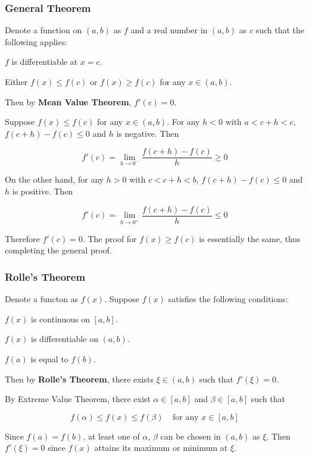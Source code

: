 \subsubsection{General Theorem}
\begin{thm}
  Denote a function on $(a,b)$ as $f$ and a real number in $(a,b)$ as $c$ such that the following applies:

  \begin{alist}
    \item $f$ is differentiable at $x=c$.
    \item Either $f(x)\leq f(c)$ or $f(x)\geq f(c)$ for any $x\in (a,b)$.
  \end{alist}

  Then by \textbf{Mean Value Theorem}, $f'(c)=0$.\n

  \prf Suppose $f(x)\leq f(c)$ for any $x\in (a,b)$. For any $h<0$ with $a<c+h<c$, $f(c+h)-f(c)\leq 0$ and $h$ is negative. Then

  $$f'(c)=\lim_{h\to 0^{-}}\frac{f(c+h)-f(c)}{h}\geq 0$$\s

  On the other hand, for any $h>0$ with $c<c+h<b$, $f(c+h)-f(c)\leq 0$ and $h$ is positive. Then

  $$f'(c)=\lim_{h\to 0^{+}}\frac{f(c+h)-f(c)}{h}\leq 0$$\s

  Therefore $f'(c)=0$. The proof for $f(x)\geq f(c)$ is essentially the same, thus completing the general proof.
\end{thm}

\subsubsection{Rolle's Theorem}
\begin{thm}
  Denote a functon as $f(x)$. Suppose $f(x)$ satisfies the following conditions:

  \begin{alist}
    \item $f(x)$ is continuous on $[a,b]$.
    \item $f(x)$ is differentiable on $(a,b)$.
    \item $f(a)$ is equal to $f(b)$.
  \end{alist}

  Then by \textbf{Rolle's Theorem}, there exists $\xi\in (a,b)$ such that $f'(\xi)=0$.\n

  \prf By Extreme Value Theorem, there exist $\alpha\in [a,b]$ and $\beta\in [a,b]$ such that

  $$f(\alpha)\leq f(x)\leq f(\beta)\;\;\;\;\text{for any }x\in [a,b]$$\s

  Since $f(a)=f(b)$, at least one of $\alpha$, $\beta$ can be chosen in $(a,b)$ as $\xi$. Then $f'(\xi)=0$ since $f(x)$ attains its maximum or minimum at $\xi$.
\end{thm}

